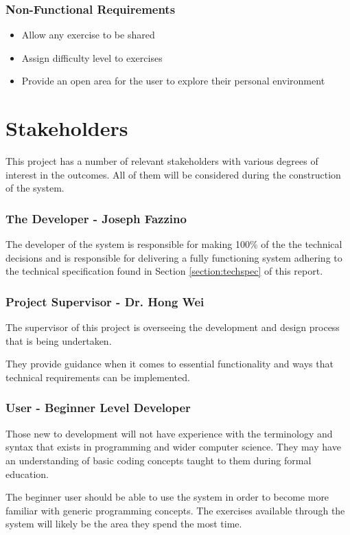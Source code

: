 \subsubsection{Non-Functional Requirements}
\begin{itemize}
    \item Allow any exercise to be shared
    \item Assign difficulty level to exercises
    \item Provide an open area for the user to explore their personal environment
\end{itemize}

\section{Stakeholders} \label{section:stake}
This project has a number of relevant stakeholders with various degrees of interest in the outcomes. All of them will be considered during the construction of the system.

\subsubsection{The Developer - Joseph Fazzino}
The developer of the system is responsible for making 100\% of the the technical decisions and is responsible for delivering a fully functioning system adhering to the technical specification found in  Section \ref{section:techspec} of this report.

\subsubsection{Project Supervisor - Dr. Hong Wei}
The supervisor of this project is overseeing the development and design process that is being undertaken. 

They provide guidance when it comes to essential functionality and ways that technical requirements can be implemented.

\subsubsection{User - Beginner Level Developer}
Those new to development will not have experience with the terminology and syntax that exists in programming and wider computer science. They may have an understanding of basic coding concepts taught to them during formal education.

The beginner user should be able to use the system in order to become more familiar with generic programming concepts. The exercises available through the system will likely be the area they spend the most time.

